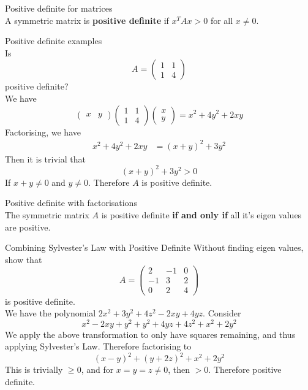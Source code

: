 \documentclass[journal, letterpaper]{IEEEtran}
\begin{document}
    \begin{mybox}{Positive definite for matrices} \\ 
        A symmetric matrix is \textbf{positive definite} if $x^TAx > 0$ for all $x \ne 0$.
    \end{mybox}
    \begin{myboxg}{Positive definite examples} \\ 
        Is 
        $$ A = \begin{pmatrix}
            1 & 1 \\ 1 & 4
        \end{pmatrix}$$
        positive definite?
        \newline \\ 
        We have
        $$ \begin{pmatrix}
            x & y
        \end{pmatrix} \begin{pmatrix}
            1 & 1 \\ 1 & 4
        \end{pmatrix} \begin{pmatrix}
            x \\ y
        \end{pmatrix} = x^2 + 4y^2 + 2xy$$
        Factorising, we have
        \begin{align*}
            x^2 + 4y^2 + 2xy &= (x+y)^2 + 3y^2 
        \end{align*}
        Then it is trivial that
        $$ (x+y)^2 + 3y^2 > 0$$
        If $x + y \ne 0$ and $y \ne 0$. Therefore $A$ is positive definite.
    \end{myboxg}
    \begin{mybox}{Positive definite with factorisations} \\ 
        The symmetric matrix $A$ is positive definite \textbf{if and only if} all it's eigen values are positive.
    \end{mybox}
    \begin{myboxg}{Combining Sylvester's Law with Positive Definite}
        Without finding eigen values, show that
        $$ A = \begin{pmatrix}
            2 & -1 & 0 \\ -1 & 3 & 2 \\ 0 & 2 & 4
        \end{pmatrix}$$
        is positive definite.
        \newline \\
        We have the polynomial $2x^2 + 3y^2 + 4z^2 - 2xy + 4yz$. Consider
        $$ x^2 - 2xy + y^2 + y^2 + 4yz + 4z^2 + x^2 + 2y^2$$
        We apply the above transformation to only have squares remaining, and thus applying Sylvester's Law. Therefore factorising to
        $$ (x - y)^2 + (y + 2z)^2 + x^2 + 2y^2$$
        This is trivially  $\ge 0$, and for $x = y = z \ne 0$, then $> 0$. Therefore positive definite.
    \end{myboxg}
\end{document}
